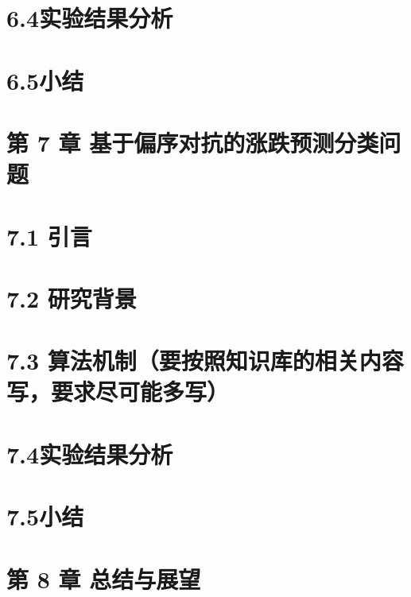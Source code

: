 \documentclass[UTF8]{ctexart}
\begin{document}
\section{6.4实验结果分析}\label{ux5b9eux9a8cux7ed3ux679cux5206ux6790-2}

\section{6.5小结}\label{ux5c0fux7ed3-3}

\section{第 7 章
基于偏序对抗的涨跌预测分类问题}\label{ux7b2c-7-ux7ae0-ux57faux4e8eux504fux5e8fux5bf9ux6297ux7684ux6da8ux8dccux9884ux6d4bux5206ux7c7bux95eeux9898}

\section{7.1 引言}\label{ux5f15ux8a00-4}

\section{7.2 研究背景}\label{ux7814ux7a76ux80ccux666f-2}

\section{7.3
算法机制（要按照知识库的相关内容写，要求尽可能多写）}\label{ux7b97ux6cd5ux673aux5236ux8981ux6309ux7167ux77e5ux8bc6ux5e93ux7684ux76f8ux5173ux5185ux5bb9ux5199ux8981ux6c42ux5c3dux53efux80fdux591aux5199}

\section{7.4实验结果分析}\label{ux5b9eux9a8cux7ed3ux679cux5206ux6790-3}

\section{7.5小结}\label{ux5c0fux7ed3-4}

\section{\texorpdfstring{第 8 章 总结与展望
}{第 8 章 总结与展望 }}\label{ux7b2c-8-ux7ae0-ux603bux7ed3ux4e0eux5c55ux671b}
\end{document}
